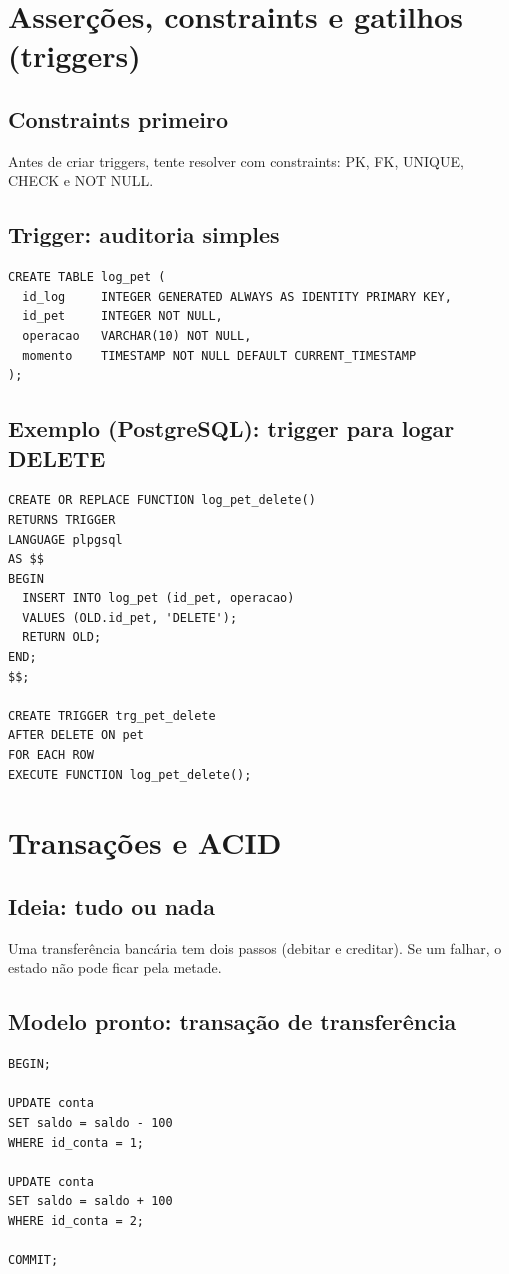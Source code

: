 \documentclass[12pt,a4paper]{article}
\begin{document}
\section{Asserções, constraints e gatilhos (triggers)}

\subsection{Constraints primeiro}
Antes de criar triggers, tente resolver com constraints: PK, FK, UNIQUE, CHECK e NOT NULL.

\subsection{Trigger: auditoria simples}
\begin{lstlisting}[style=sql]
CREATE TABLE log_pet (
  id_log     INTEGER GENERATED ALWAYS AS IDENTITY PRIMARY KEY,
  id_pet     INTEGER NOT NULL,
  operacao   VARCHAR(10) NOT NULL,
  momento    TIMESTAMP NOT NULL DEFAULT CURRENT_TIMESTAMP
);
\end{lstlisting}

\subsection{Exemplo (PostgreSQL): trigger para logar DELETE}
\begin{lstlisting}[style=sql]
CREATE OR REPLACE FUNCTION log_pet_delete()
RETURNS TRIGGER
LANGUAGE plpgsql
AS $$
BEGIN
  INSERT INTO log_pet (id_pet, operacao)
  VALUES (OLD.id_pet, 'DELETE');
  RETURN OLD;
END;
$$;

CREATE TRIGGER trg_pet_delete
AFTER DELETE ON pet
FOR EACH ROW
EXECUTE FUNCTION log_pet_delete();
\end{lstlisting}

\section{Transações e ACID}

\subsection{Ideia: tudo ou nada}
Uma transferência bancária tem dois passos (debitar e creditar). Se um falhar, o estado não pode ficar pela metade.

\subsection{Modelo pronto: transação de transferência}
\begin{lstlisting}[style=sql]
BEGIN;

UPDATE conta
SET saldo = saldo - 100
WHERE id_conta = 1;

UPDATE conta
SET saldo = saldo + 100
WHERE id_conta = 2;

COMMIT;
\end{lstlisting}
\end{document}
